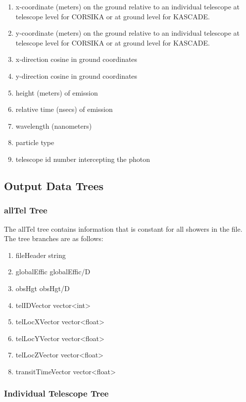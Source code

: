 \documentclass{article}
\begin{document}
\begin{enumerate}
 \setlength{\itemsep}{0cm}%
 \setlength{\parskip}{0cm}%
 \item
   x-coordinate (meters) on the ground relative to an individual telescope 
   at telescope level for CORSIKA or at ground level for KASCADE.
 \item
   y-coordinate (meters) on the ground relative to an individual telescope
   at telescope level for CORSIKA or at ground level for KASCADE.
 \item
   x-direction cosine in ground coordinates
 \item
   y-direction cosine in ground coordinates
 \item
   height (meters) of emission
 \item
   relative time (nsecs) of emission
 \item
   wavelength (nanometers)
 \item
   particle type
 \item
   telescope id number intercepting the photon
\end{enumerate}


\subsection {Output Data Trees}\label{SS:ODATA}
\subsubsection{allTel Tree}
The allTel tree contains information that is constant for all showers in the file.
The tree branches are as follows:
\begin{enumerate}
 \setlength{\itemsep}{0cm}%
 \setlength{\parskip}{0cm}%

 \item
 fileHeader  string
 \item
 globalEffic  globalEffic/D
 \item
 obsHgt  obsHgt/D
 \item
 telIDVector  vector<int>
 \item
 telLocXVector  vector<float>
 \item
 telLocYVector  vector<float>
 \item
 telLocZVector  vector<float>
 \item
 transitTimeVector  vector<float>
\end{enumerate}

\subsubsection{Individual Telescope Tree}
\end{document}
